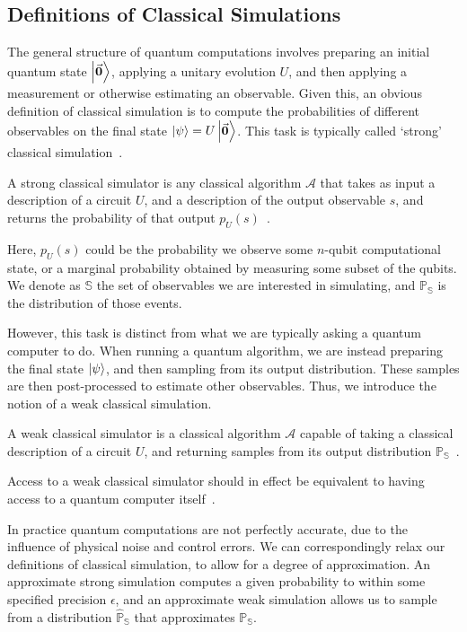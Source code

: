 \subsection{Definitions of Classical Simulations}\label{sec:intro_simulation_types}
The general structure of quantum computations involves preparing an initial quantum state $\ket{\va{0}}$, applying a unitary evolution $U$, and then applying a measurement or otherwise estimating an observable. Given this, an obvious definition of classical simulation is to compute the probabilities of different observables on the final state $\ket{\psi}=U\ket{\va{0}}$. This task is typically called `strong' classical simulation~\cite{VandenNest2008}.
\begin{defn}\label{def:strong_simulation}
A strong classical simulator is any classical algorithm $\mathcal{A}$ that takes as input a description of a circuit $U$, and a description of the output observable $s$, and returns the probability of that output $p_{U}\left(s\right)$~\cite{VandenNest2008}.
\end{defn}
Here, $p_{U}\left(s\right)$ could be the probability we observe some $n$-qubit computational state, or a marginal probability obtained by measuring some subset of the qubits. We denote as $\mathbb{S}$ the set of observables we are interested in simulating, and $\mathbb{P}_{\mathbb{S}}$ is the distribution of those events.\par
However, this task is distinct from what we are typically asking a quantum computer to do. When running a quantum algorithm, we are instead preparing the final state $\ket{\psi}$, and then sampling from its output distribution. These samples are then post-processed to estimate other observables. Thus, we introduce the notion of a weak classical simulation.
\begin{defn}\label{def:weak_simulation}
A weak classical simulator is a classical algorithm $\mathcal{A}$ capable of taking a classical description of a circuit $U$, and returning samples from its output distribution $\mathbb{P}_{\mathbb{S}}$~\cite{VandenNest2008}.
\end{defn}
Access to a weak classical simulator should in effect be equivalent to having access to a quantum computer itself~\cite{Pashayan2017}.\par
In practice quantum computations are not perfectly accurate, due to the influence of physical noise and control errors. We can correspondingly relax our definitions of classical simulation, to allow for a degree of approximation. An approximate strong simulation computes a given probability to within some specified precision $\epsilon$, and an approximate weak simulation allows us to sample from a distribution $\mathbb{\hat{P}}_{\mathbb{S}}$ that approximates $\mathbb{P}_{\mathbb{S}}$.\par
